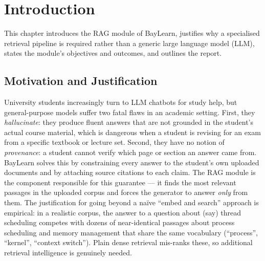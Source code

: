 \documentclass[12pt,a4paper]{report}
\begin{document}
\chapter{Introduction}
This chapter introduces the RAG module of BayLearn, justifies why a specialised
retrieval pipeline is required rather than a generic large language model (LLM),
states the module's objectives and outcomes, and outlines the report.

\section{Motivation and Justification}
University students increasingly turn to LLM chatbots for study help, but
general-purpose models suffer two fatal flaws in an academic setting. First, they
\emph{hallucinate}: they produce fluent answers that are not grounded in the
student's actual course material, which is dangerous when a student is revising
for an exam from a specific textbook or lecture set. Second, they have no notion
of \emph{provenance}: a student cannot verify which page or section an answer
came from. BayLearn solves this by constraining every answer to the student's own
uploaded documents and by attaching source citations to each claim. The RAG
module is the component responsible for this guarantee --- it finds the most
relevant passages in the uploaded corpus and forces the generator to answer
\emph{only} from them. The justification for going beyond a na\"ive ``embed and
search'' approach is empirical: in a realistic corpus, the answer to a question
about (say) thread scheduling competes with dozens of near-identical passages
about process scheduling and memory management that share the same vocabulary
(``process'', ``kernel'', ``context switch''). Plain dense retrieval mis-ranks
these, so additional retrieval intelligence is genuinely needed.
\end{document}

